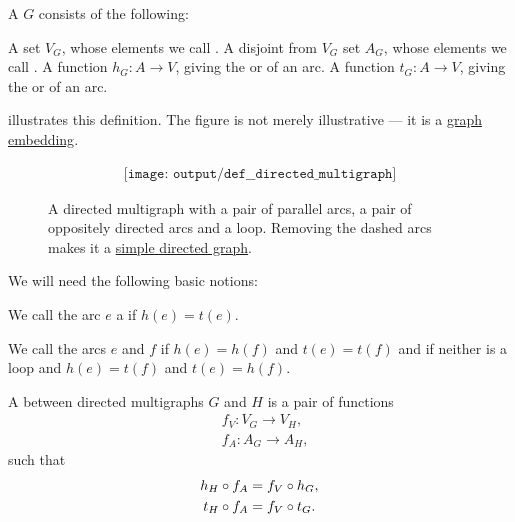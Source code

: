 \begin{definition}\label{def:directed_multigraph}
  A  \( G \) consists of the following:
  \begin{thmenum}[series=def:directed_multigraph]
     A set \( V_G \), whose elements we call .
     A disjoint from \( V_G \) set \( A_G \), whose elements we call .
     A function \( h_G: A \to V \), giving the  or  of an arc.
     A function \( t_G: A \to V \), giving the  or  of an arc.
  \end{thmenum}

   illustrates this definition. The figure is not merely illustrative --- it is a \hyperref[def:graph_geometric_realization/embedding]{graph embedding}.

  \begin{figure}[!ht]
    \begin{equation}\label{eq:fig:def:directed_multigraph}
      \begin{aligned}
        \texttt{[image: output/def\_\_directed\_multigraph]}
      \end{aligned}
    \end{equation}
    \caption{A directed multigraph with a pair of parallel arcs, a pair of oppositely directed arcs and a loop. Removing the dashed arcs makes it a \hyperref[def:directed_graph]{simple directed graph}.}\label{fig:def:directed_multigraph}
  \end{figure}

  We will need the following basic notions:
  \begin{thmenum}[resume=def:directed_multigraph]
     We call the arc \( e \) a  if \( h(e) = t(e) \).

    \medskip

     We call the arcs \( e \) and \( f \)  if \( h(e) = h(f) \) and \( t(e) = t(f) \) and  if neither is a loop and \( h(e) = t(f) \) and \( t(e) = h(f) \).

     A  between directed multigraphs \( G \) and \( H \) is a pair of functions
    \begin{align*}
      &f_V: V_G \to V_H, \\
      &f_A: A_G \to A_H,
    \end{align*}
    such that
    \begin{align}
      h_H \bincirc f_A &= f_V \bincirc h_G, \label{eq:def:directed_multigraph/homomorphism/head} \\
      t_H \bincirc f_A &= f_V \bincirc t_G. \label{eq:def:directed_multigraph/homomorphism/tail}
    \end{align}


\end{thmenum}
\end{definition}
